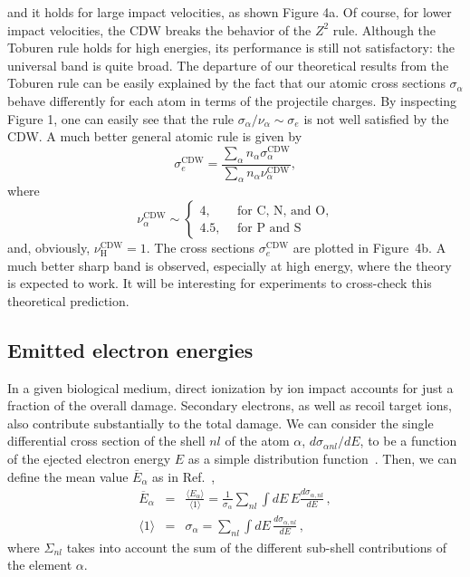 \documentclass[preprint,12pt]{article}
\begin{document}
and it holds for large impact velocities, as shown Figure 4a.
Of course, for lower impact velocities, the CDW breaks the behavior of 
the $Z^{2}$ rule. Although the Toburen rule holds for high energies, 
its performance is still not satisfactory: the universal band is quite 
broad. The departure of our theoretical 
results from the Toburen rule can be easily explained by the fact that 
our atomic cross sections $\sigma_{\alpha}$ behave differently for 
each atom in terms of the projectile charges. By inspecting Figure 1, 
one can easily see that the rule $\sigma_{\alpha}/\nu_{\alpha}\sim
\sigma_{e}$ is not well satisfied by the CDW. A much better general 
atomic rule is given by
\begin{equation}
\sigma_{e}^{\text{CDW}}=\frac{\sum\limits_{\alpha}
n_{\alpha}\sigma_{\alpha}^{\text{CDW}}}{\sum\limits_{\alpha}n_{\alpha}
\nu_{\alpha}^{\text{CDW}}},
\label{32} 
\end{equation}
where 
\begin{equation}
\nu_{\alpha }^{\text{CDW}} \sim\left\{ 
\begin{array}{ll}
4,\ \ \  & \text{for C, N, and O,} \\ 
4.5,\ \  & \text{for P and S}
\end{array}
\right. 
\label{eq:scalingCDW}
\end{equation}
and, obviously, $\nu_{\text{H}}^{\text{CDW}}=1$. The cross sections 
$\sigma_{e}^{\text{CDW}}$ are plotted in Figure~4b. A much better sharp 
band is observed, especially at high energy, where the theory is 
expected to work. It will be interesting for experiments to cross-check 
this theoretical prediction.

\subsection{Emitted electron energies}

In a given biological medium, direct ionization by ion impact accounts 
for just a fraction of the overall damage. Secondary electrons, as well 
as recoil target ions, also contribute substantially to the total damage. 
We can consider the single differential cross section of the shell 
$nl$ of the atom $\alpha$, $d\sigma _{\alpha nl}/dE$, to be a function 
of the ejected electron energy $E$ as a simple distribution 
function~\cite{surdutovic2018}. Then, we can define the mean value 
$\overline{E}_{\alpha}$ as in Ref.~\cite{abril2015},
\begin{eqnarray}
\overline{E}_{\alpha} &=&\frac{\langle E_{\alpha}\rangle}{\langle
1\rangle}=\frac{1}{\sigma_{\alpha}}\sum\limits_{nl}\int dE\,E
\frac{d\sigma_{\alpha,nl}}{dE}\,,  
\label{40} \\
\langle 1\rangle &=&\sigma_{\alpha}=\sum\limits_{nl}\int dE\,
\frac{d\sigma_{\alpha,nl}}{dE}\,,  
\label{50}
\end{eqnarray}
where $\Sigma_{nl}$ takes into account the sum of the different 
sub-shell contributions of the element $\alpha$.
\end{document}
